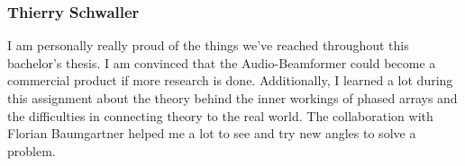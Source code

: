 \subsubsection{Thierry Schwaller}
I am personally really proud of the things we've reached throughout this bachelor's thesis. I am convinced that the Audio-Beamformer could become a commercial product if more research is done. 
Additionally, I learned a lot during this assignment about the theory behind the inner workings of phased arrays and the difficulties in connecting theory to the real world. 
The collaboration with Florian Baumgartner helped me a lot to see and try new angles to solve a problem. 